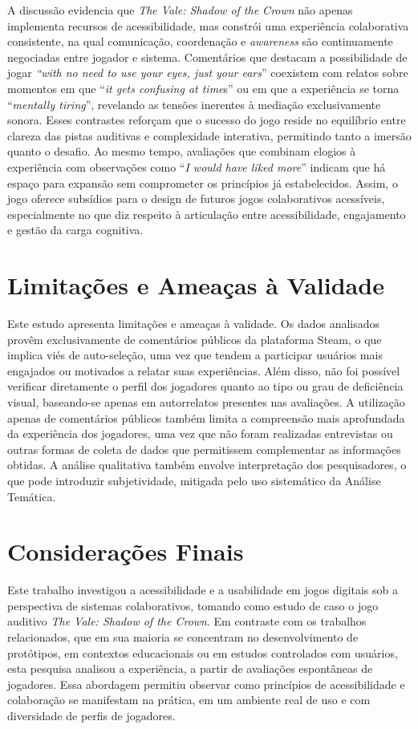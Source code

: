 \documentclass[12pt]{article}
\begin{document}
{{A discussão evidencia que \textit{The Vale: Shadow of the Crown} não apenas implementa recursos de acessibilidade, mas constrói uma experiência colaborativa consistente, na qual comunicação, coordenação e \textit{awareness} são continuamente negociadas entre jogador e sistema. Comentários que destacam a possibilidade de jogar \textit{“with no need to use your eyes, just your ears}” coexistem com relatos sobre momentos em que “\textit{it gets confusing at time}s” ou em que a experiência se torna “\textit{mentally tiring}”, revelando as tensões inerentes à mediação exclusivamente sonora. Esses contrastes reforçam que o sucesso do jogo reside no equilíbrio entre clareza das pistas auditivas e complexidade interativa, permitindo tanto a imersão quanto o desafio. Ao mesmo tempo, avaliações que combinam elogios à experiência com observações como “\textit{I would have liked more}” indicam que há espaço para expansão sem comprometer os princípios já estabelecidos. Assim, o jogo oferece subsídios para o design de futuros jogos colaborativos acessíveis, especialmente no que diz respeito à articulação entre acessibilidade, engajamento e gestão da carga cognitiva.


\section{Limitações e Ameaças à Validade}

Este estudo apresenta limitações e ameaças à validade. Os dados analisados provêm exclusivamente de comentários públicos da plataforma Steam, o que implica viés de auto-seleção, uma vez que tendem a participar usuários mais engajados ou motivados a relatar suas experiências. Além disso, não foi possível verificar diretamente o perfil dos jogadores quanto ao tipo ou grau de deficiência visual, baseando-se apenas em autorrelatos presentes nas avaliações. A utilização apenas de comentários públicos também limita a compreensão mais aprofundada da experiência dos jogadores, uma vez que não foram realizadas entrevistas ou outras formas de coleta de dados que permitissem complementar as informações obtidas. A análise qualitativa também envolve interpretação dos pesquisadores, o que pode introduzir subjetividade, mitigada pelo uso sistemático da Análise Temática.

\section{Considerações Finais}

Este trabalho investigou a acessibilidade e a usabilidade em jogos digitais sob a perspectiva de sistemas colaborativos, tomando como estudo de caso o jogo auditivo \textit{The Vale: Shadow of the Crown}. Em contraste com os trabalhos relacionados\cite{10.1145/1067343.1067361,agrimi2024game,ran2025users,sbgames}, que em sua maioria se concentram no desenvolvimento de protótipos, em contextos educacionais ou em estudos controlados com usuários, esta pesquisa analisou a experiência, a partir de avaliações espontâneas de jogadores. Essa abordagem permitiu observar como princípios de acessibilidade e colaboração se manifestam na prática, em um ambiente real de uso e com diversidade de perfis de jogadores.

}}
\end{document}
